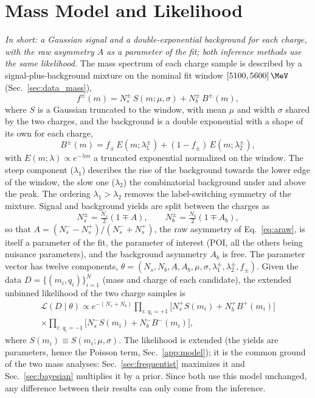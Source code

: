 \section{Mass Model and Likelihood}
\label{sec:model}
\label{app:model}
\label{sec:bayes_model}
\emph{In short: a Gaussian signal and a double-exponential background for each charge, with the raw asymmetry $A$ as a parameter of the fit; both inference methods use the same likelihood.}
The mass spectrum of each charge sample is described by a signal-plus-background mixture on the nominal fit window $[5100,5600]\,\MeV$ (Sec.~\ref{sec:data_mass}),
\begin{equation}
f^{\pm}(m)=N_s^{\pm}\,S(m;\mu,\sigma)+N_b^{\pm}\,B^{\pm}(m),
\label{eq:mixture}
\end{equation}
where $S$ is a Gaussian truncated to the window, with mean $\mu$ and width $\sigma$ shared by the two charges, and the background is a double exponential with a shape of its own for each charge,
\[
B^{\pm}(m)=f_{\pm}\,E(m;\lambda_{1}^{\pm})+(1-f_{\pm})\,E(m;\lambda_{2}^{\pm}),
\]
with $E(m;\lambda)\propto e^{-\lambda m}$ a truncated exponential normalized on the window. The steep component ($\lambda_1$) describes the rise of the background towards the lower edge of the window, the slow one ($\lambda_2$) the combinatorial background under and above the peak. The ordering $\lambda_1>\lambda_2$ removes the label-switching symmetry of the mixture. Signal and background yields are split between the charges as
\[
N_s^{\pm}=\tfrac{N_s}{2}(1\mp A),\qquad N_b^{\pm}=\tfrac{N_b}{2}(1\mp A_b),
\]
so that $A=(N_s^--N_s^+)/(N_s^-+N_s^+)$, the raw asymmetry \Araw of Eq.~\eqref{eq:araw}, is itself a parameter of the fit, the parameter of interest (POI, all the others being nuisance parameters), and the background asymmetry $A_b$ is free. The parameter vector has twelve components, $\theta=(N_s,N_b,A,A_b,\mu,\sigma,\lambda_1^{\pm},\lambda_2^{\pm},f_{\pm})$.
Given the data $D=\{(m_i,q_i)\}_{i=1}^{N}$ (mass and charge of each candidate), the extended unbinned likelihood of the two charge samples is
\begin{multline}
\mathcal{L}(D\mid\theta)\propto e^{-(N_s+N_b)}
\prod_{i:\,q_i=+1}\Big[N_s^{+}S(m_i)+N_b^{+}B^{+}(m_i)\Big] \\
\times\prod_{i:\,q_i=-1}\Big[N_s^{-}S(m_i)+N_b^{-}B^{-}(m_i)\Big],
\label{eq:likelihood}
\end{multline}
where $S(m_i)\equiv S(m_i;\mu,\sigma)$. The likelihood is extended (the yields are parameters, hence the Poisson term, Sec.~\ref{app:model}); it is the common ground of the two mass analyses: Sec.~\ref{sec:frequentist} maximizes it and Sec.~\ref{sec:bayesian} multiplies it by a prior. Since both use this model unchanged, any difference between their results can only come from the inference.
